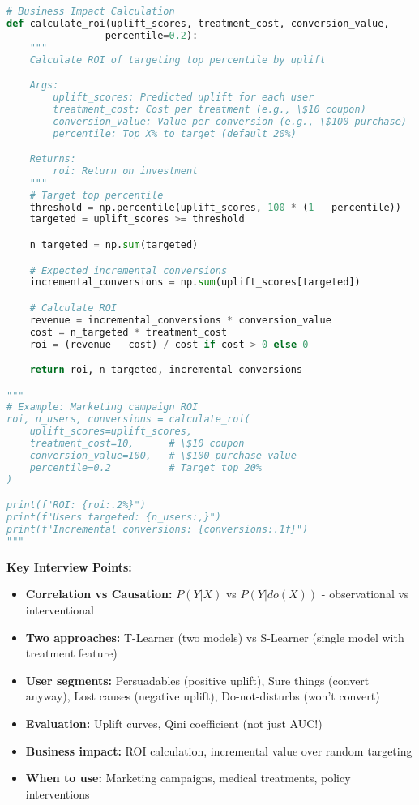 \documentclass[8pt,landscape]{article}
\begin{document}
\begin{multicols}{3}
\begin{lstlisting}[language=Python]
# Business Impact Calculation
def calculate_roi(uplift_scores, treatment_cost, conversion_value,
                 percentile=0.2):
    """
    Calculate ROI of targeting top percentile by uplift

    Args:
        uplift_scores: Predicted uplift for each user
        treatment_cost: Cost per treatment (e.g., \$10 coupon)
        conversion_value: Value per conversion (e.g., \$100 purchase)
        percentile: Top X% to target (default 20%)

    Returns:
        roi: Return on investment
    """
    # Target top percentile
    threshold = np.percentile(uplift_scores, 100 * (1 - percentile))
    targeted = uplift_scores >= threshold

    n_targeted = np.sum(targeted)

    # Expected incremental conversions
    incremental_conversions = np.sum(uplift_scores[targeted])

    # Calculate ROI
    revenue = incremental_conversions * conversion_value
    cost = n_targeted * treatment_cost
    roi = (revenue - cost) / cost if cost > 0 else 0

    return roi, n_targeted, incremental_conversions

"""
# Example: Marketing campaign ROI
roi, n_users, conversions = calculate_roi(
    uplift_scores=uplift_scores,
    treatment_cost=10,      # \$10 coupon
    conversion_value=100,   # \$100 purchase value
    percentile=0.2          # Target top 20%
)

print(f"ROI: {roi:.2%}")
print(f"Users targeted: {n_users:,}")
print(f"Incremental conversions: {conversions:.1f}")
"""
\end{lstlisting}

\textbf{Key Interview Points:}
\begin{itemize}
\item \textbf{Correlation vs Causation:} $P(Y|X)$ vs $P(Y|do(X))$ - observational vs interventional
\item \textbf{Two approaches:} T-Learner (two models) vs S-Learner (single model with treatment feature)
\item \textbf{User segments:} Persuadables (positive uplift), Sure things (convert anyway), Lost causes (negative uplift), Do-not-disturbs (won't convert)
\item \textbf{Evaluation:} Uplift curves, Qini coefficient (not just AUC!)
\item \textbf{Business impact:} ROI calculation, incremental value over random targeting
\item \textbf{When to use:} Marketing campaigns, medical treatments, policy interventions
\end{itemize}


\end{multicols}
\end{document}
